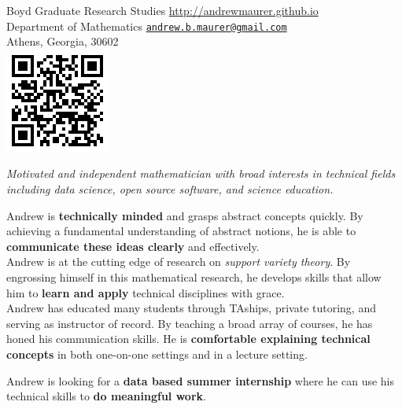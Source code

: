 \documentclass[10pt,a4paper]{article}
\begin{document}
\sloppy  %



\spacedhrule{0.9em}{-0.4em}  %


\noindent
Boyd Graduate Research Studies\tabto{7cm} \url{http://andrewmaurer.github.io} \\
Department of Mathematics \tabto{7cm} \href{mailto:andrew.b.maurer@gmail.com}{\texttt{andrew.b.maurer@gmail.com}} \\
Athens, Georgia, 30602 \ \\
\tabto{14.5cm}\includegraphics[scale=.5]{qr.png}\\

\spacedhrule{-.5em}{-.4em}


\vspace{-1.3em}  %
\begin{multicols}{2}  %
\noindent \emph{Motivated and independent mathematician with broad interests in technical fields including data science, open source software, and science education.}

Andrew is \textbf{technically minded} and grasps abstract concepts quickly. By achieving a fundamental understanding of abstract notions, he is able to \textbf{communicate these ideas clearly} and effectively.
\\
\indent Andrew is at the cutting edge of research on \emph{support variety theory}. By engrossing himself in this mathematical research, he develops skills that allow him to \textbf{learn and apply} technical disciplines with grace.
\\
\indent Andrew has educated many students through TAships, private tutoring, and serving as instructor of record. By teaching a broad array of courses, he has honed his communication skills. He is
 \textbf{comfortable explaining technical concepts} in both one-on-one settings and in a lecture setting.

Andrew is looking for a \textbf{data based summer internship} where he can use his technical skills to \textbf{do meaningful work}.
\end{multicols}
\end{document}

